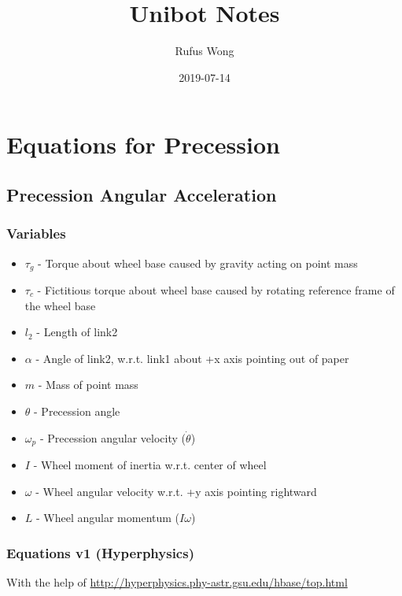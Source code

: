 \documentclass{article}
\title{Unibot Notes}
\date{2019-07-14}
\author{Rufus Wong}
\begin{document}
\maketitle
{}
\newpage

\section{Equations for Precession}

\subsection{Precession Angular Acceleration}

\subsubsection{Variables}

\begin{itemize}
    \item $\tau_g$ - Torque about wheel base caused by gravity acting on point mass
    \item $\tau_c$ - Fictitious torque about wheel base caused by rotating reference frame of the wheel base
    \item $l_2$ - Length of link2
    \item $\alpha$ - Angle of link2, w.r.t. link1 about +x axis pointing out of paper
    \item $m$ - Mass of point mass
    \item $\theta$ - Precession angle
    \item $\omega_p$ - Precession angular velocity ($\dot{\theta}$)
    \item $I$ - Wheel moment of inertia w.r.t. center of wheel
    \item $\omega$ - Wheel angular velocity w.r.t. +y axis pointing rightward
    \item $L$ - Wheel angular momentum ($I\omega$)
\end{itemize}

\subsubsection{Equations v1 (Hyperphysics)}

With the help of \url{http://hyperphysics.phy-astr.gsu.edu/hbase/top.html}
\end{document}
